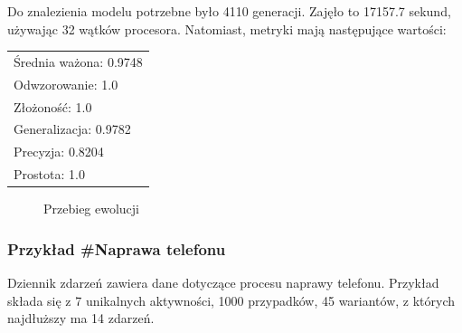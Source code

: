 Do znalezienia modelu potrzebne było 4110 generacji. Zajęło to 17157.7 sekund, używając 32 wątków procesora. Natomiast, metryki mają następujące wartości: 

 \begin{center}
  \begin{tabular}{l}
	Średnia ważona: 0.9748 \\
	Odwzorowanie: 1.0 \\
	Złożoność: 1.0 \\
	Generalizacja: 0.9782 \\
	Precyzja: 0.8204 \\
	Prostota: 1.0
  \end{tabular}
 \end{center}
 
\begin{figure}[H]
	\caption{\label{fig:flow_chart}Przebieg ewolucji}
\end{figure}

\subsubsection{Przykład \#Naprawa telefonu}
Dziennik zdarzeń zawiera dane dotyczące procesu naprawy telefonu.
Przykład składa się z 7 unikalnych aktywności, 1000 przypadków, 45 wariantów, z których najdłuższy ma 14 zdarzeń. 

